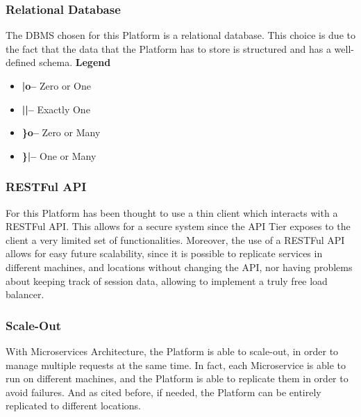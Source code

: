 \subsubsection{Relational Database}
The DBMS chosen for this Platform is a relational database. This choice is due to the fact that the data that the Platform has to store is structured and has a well-defined schema.
\textbf{Legend}
\begin{itemize}
    \item \textbf{|o--} Zero or One
    \item \textbf{||--} Exactly One
    \item \textbf{\}o--} Zero or Many
    \item \textbf{\}|--} One or Many
\end{itemize}
\newpage

\subsubsection{RESTFul API} \label{parr:restful}
For this Platform has been thought to use a thin client which interacts with a RESTFul API. This allows for a secure system since the API Tier exposes to the client a very limited set of functionalities. 
Moreover, the use of a RESTFul API allows for easy future scalability, since it is possible to replicate services in different machines, and locations without changing the API, nor having problems about keeping track of session data, allowing to implement a truly free load balancer. 

\subsubsection{Scale-Out}
With Microservices Architecture, the Platform is able to scale-out, in order to manage multiple requests at the same time. In fact, each Microservice is able to run on different machines, and the Platform is able to replicate them in order to avoid failures. And as cited before, if needed, the Platform can be entirely replicated to different locations.